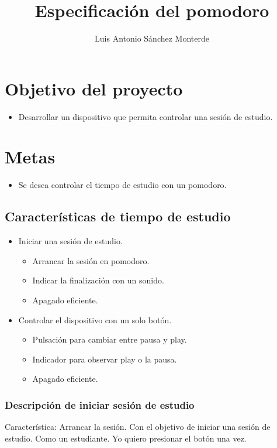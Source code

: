 \documentclass{article}
\title{Especificación del pomodoro}
\author{Luis Antonio Sánchez Monterde}
\begin{document}
\maketitle
\section{Objetivo del proyecto}
\begin{itemize}
	\item Desarrollar un dispositivo que permita controlar una sesión de
		estudio.
\end{itemize}
\section{Metas}
\begin{itemize}
	\item Se desea controlar el tiempo de estudio con un pomodoro.
\end{itemize}

\subsection{Características de tiempo de estudio}
\begin{itemize}
	\item Iniciar una sesión de estudio.
	\begin{itemize}
		\item Arrancar la sesión en pomodoro.
		\item Indicar la finalización con un sonido.
		\item Apagado eficiente.
	\end{itemize}

	\item Controlar el dispositivo con un solo botón.
	\begin{itemize}
		\item Pulsación para cambiar entre pausa y play.
		\item Indicador para observar play o la pausa.
		\item Apagado eficiente.
	\end{itemize}
\end{itemize}

\subsubsection{Descripción de iniciar sesión de estudio}
Característica: Arrancar la sesión.
Con el objetivo de iniciar una sesión de estudio.
Como un estudiante.
Yo quiero presionar el botón una vez.
\end{document}
